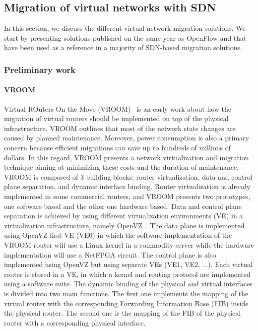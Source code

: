 \newpage
\subsection{Migration of virtual networks with SDN}
\label{sec:sota-vnmigration}
In this section, we discuss the different virtual network migration solutions.
We start by presenting solutions published on the same year as OpenFlow and that have been used as a reference in a majority of SDN-based migration solutions.

\subsubsection{Preliminary work}

\paragraph{VROOM}
Virtual ROuters On the Move (VROOM)~\cite{VROOM-Wang2008} is an early work about how the migration of virtual routers should be implemented on top of the physical infrastructure. 
VROOM outlines that most of the network state changes are caused by planned maintenance.
Moreover, power consumption is also a primary concern because efficient migrations can save up to hundreds of millions of dollars.
In this regard, VROOM presents a network virtualization and migration technique aiming at minimizing these costs and the duration of maintenance.
VROOM is composed of 3 building blocks: router virtualization, data and control plane separation, and dynamic interface binding.
Router virtualization is already implemented in some commercial routers, and VROOM presents two prototypes, one software based and the other one hardware based.
Data and control plane separation is achieved by using different virtualization environments (VE) in a virtualization infrastructure, namely OpenVZ~\cite{openvz}.
The data plane is implemented using OpenVZ first VE (VE0) in which the software implementation of the VROOM router will use a Linux kernel in a commodity server while the hardware implementation will use a NetFPGA circuit.
The control plane is also implemented using OpenVZ but using separate VEs (VE1, VE2, ...).
Each virtual router is stored in a VE, in which a kernel and routing protocol are implemented using a software suite.
The dynamic binding of the physical and virtual interfaces is divided into two main functions.
The first one implements the mapping of the virtual router with the corresponding Forwarding Information Base (FIB) inside the physical router.
The second one is the mapping of the FIB of the physical router with a corresponding physical interface.

